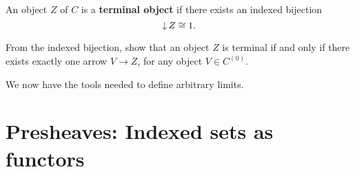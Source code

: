 \documentclass[../main.tex]{subfiles}
\begin{document}
\begin{definition}
  An object \(Z\) of \(C\) is a \textbf{terminal object} if there exists an
  indexed bijection
  \[%
    \dset Z \cong 1.
  \]%
\end{definition}
\begin{warning_box*}
  \begin{exercise}
    From the indexed bijection, show that an object \(Z\) is terminal if and
    only if there exists exactly one arrow \(V \to Z\), for any object \(V \in
    C^{(0)}\).
  \end{exercise}
\end{warning_box*}
We now have the tools needed to define arbitrary limits.

\section{Presheaves: Indexed sets as functors}

\ifSubfilesClassLoaded{%
    \newpage
    }%
\end{document}
